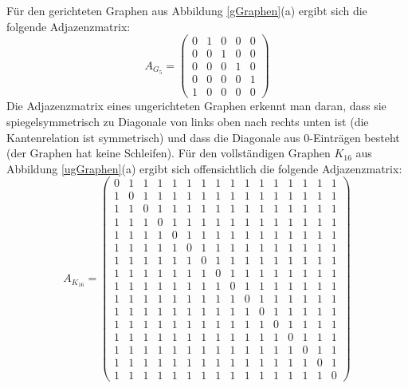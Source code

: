 \begin{example}
Für den gerichteten Graphen aus Abbildung \ref{gGraphen}(a) ergibt sich die
folgende Adjazenzmatrix:
\begin{displaymath}
A_{G_5} =
\left(
\begin{array}{ccccc}
0 & 1 & 0 & 0 & 0\\ 
0 & 0 & 1 & 0 & 0\\
0 & 0 & 0 & 1 & 0\\
0 & 0 & 0 & 0 & 1\\
1 & 0 & 0 & 0 & 0
\end{array}
\right)
\end{displaymath}
Die Adjazenzmatrix eines ungerichteten Graphen erkennt man daran, dass
sie spiegelsymmetrisch zu Diagonale von links oben nach rechts unten
ist (die Kantenrelation ist symmetrisch) und
dass die Diagonale aus $0$-Einträgen besteht (der Graphen hat keine
Schleifen). Für den vollständigen Graphen $K_{16}$ aus
Abbildung \ref{ugGraphen}(a) ergibt sich offensichtlich die folgende
Adjazenzmatrix:
\begin{displaymath}
A_{K_{16}} =
\left(
\begin{array}{cccccccccccccccc}
0 & 1 & 1 & 1 & 1 & 1 & 1 & 1 & 1 & 1 & 1 & 1 & 1 & 1 & 1 & 1\\ 
1 & 0 & 1 & 1 & 1 & 1 & 1 & 1 & 1 & 1 & 1 & 1 & 1 & 1 & 1 & 1\\ 
1 & 1 & 0 & 1 & 1 & 1 & 1 & 1 & 1 & 1 & 1 & 1 & 1 & 1 & 1 & 1\\ 
1 & 1 & 1 & 0 & 1 & 1 & 1 & 1 & 1 & 1 & 1 & 1 & 1 & 1 & 1 & 1\\ 
1 & 1 & 1 & 1 & 0 & 1 & 1 & 1 & 1 & 1 & 1 & 1 & 1 & 1 & 1 & 1\\ 
1 & 1 & 1 & 1 & 1 & 0 & 1 & 1 & 1 & 1 & 1 & 1 & 1 & 1 & 1 & 1\\ 
1 & 1 & 1 & 1 & 1 & 1 & 0 & 1 & 1 & 1 & 1 & 1 & 1 & 1 & 1 & 1\\ 
1 & 1 & 1 & 1 & 1 & 1 & 1 & 0 & 1 & 1 & 1 & 1 & 1 & 1 & 1 & 1\\ 
1 & 1 & 1 & 1 & 1 & 1 & 1 & 1 & 0 & 1 & 1 & 1 & 1 & 1 & 1 & 1\\ 
1 & 1 & 1 & 1 & 1 & 1 & 1 & 1 & 1 & 0 & 1 & 1 & 1 & 1 & 1 & 1\\ 
1 & 1 & 1 & 1 & 1 & 1 & 1 & 1 & 1 & 1 & 0 & 1 & 1 & 1 & 1 & 1\\ 
1 & 1 & 1 & 1 & 1 & 1 & 1 & 1 & 1 & 1 & 1 & 0 & 1 & 1 & 1 & 1\\ 
1 & 1 & 1 & 1 & 1 & 1 & 1 & 1 & 1 & 1 & 1 & 1 & 0 & 1 & 1 & 1\\ 
1 & 1 & 1 & 1 & 1 & 1 & 1 & 1 & 1 & 1 & 1 & 1 & 1 & 0 & 1 & 1\\ 
1 & 1 & 1 & 1 & 1 & 1 & 1 & 1 & 1 & 1 & 1 & 1 & 1 & 1 & 0 & 1\\ 
1 & 1 & 1 & 1 & 1 & 1 & 1 & 1 & 1 & 1 & 1 & 1 & 1 & 1 & 1 & 0
\end{array}
\right)
\end{displaymath}
\end{example}
